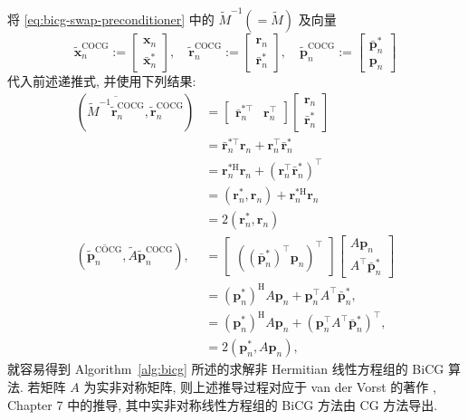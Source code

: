 {将 \eqref{eq:bicg-swap-preconditioner} 中的 $\widetilde M^{-1}(=\widetilde M)$ 及向量}
\[\widetilde{\bm x}_n^{\mathrm{COCG}}:=\begin{bmatrix}\bm x_n\\\bar{\bm x}_n^{*}\end{bmatrix},\quad\widetilde{\bm r}_n^{\mathrm{COCG}}:=\begin{bmatrix}\bm r_n\\\bar{\bm r}_n^{*}\end{bmatrix},\quad\widetilde{\bm p}_n^{\mathrm{COCG}}:=\begin{bmatrix}\bar{\bm p}_n^{*}\\\bm p_n\end{bmatrix}\]
{代入前述递推式, 并使用下列结果:}
\[\begin{aligned}
(\overline{\widetilde M^{-1}\widetilde{\bm r}_n^{\mathrm{COCG}}},\widetilde{\bm r}_n^{\mathrm{COCG}})&=\begin{bmatrix}\bar{\bm r}_n^{*\top}&\bm r_n^{\top}\end{bmatrix}\begin{bmatrix}\bm r_n\\\bar{\bm r}_n^{*}\end{bmatrix}\\
&=\bar{\bm r}_n^{*\top}\bm r_n+\bm r_n^{\top}\bar{\bm r}_n^{*}\\
&=\bm r_n^{*\mathrm H}\bm r_n+(\bm r_n^{\top}\bar{\bm r}_n^{*})^{\top}\\
&=(\bm r_n^{*},\bm r_n)+\bm r_n^{*\mathrm H}\bm r_n\\
&=2(\bm r_n^{*},\bm r_n)\\
(\overline{\widetilde{\bm p}_n^{\mathrm{COCG}}},\widetilde A\widetilde{\bm p}_n^{\mathrm{COCG}}),&=\begin{bmatrix}((\bar{\bm p}_n^{*})^{\top}\bm p_n)^{\top}\end{bmatrix}\begin{bmatrix}A\bm p_n\\A^{\top}\bar{\bm p}_n^{*}\end{bmatrix}\\
&=(\bm p_n^{*})^{\mathrm H}A\bm p_n+\bm p_n^{\top}A^{\top}\bar{\bm p}_n^{*},\\
&=(\bm p_n^{*})^{\mathrm H}A\bm p_n+(\bm p_n^{\top}A^{\top}\bar{\bm p}_n^{*})^{\top},\\
&=2(\bm p_n^{*},A\bm p_n),
\end{aligned}\]
{就容易得到 Algorithm\ \ref{alg:bicg} 所述的求解非 Hermitian 线性方程组的 BiCG 算法. 若矩阵 $A$ 为实非对称矩阵, 则上述推导过程对应于 van der Vorst 的著作 , Chapter 7 中的推导, 其中实非对称线性方程组的 BiCG 方法由 CG 方法导出.}
